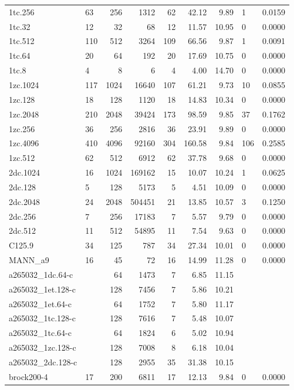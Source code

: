 \begin{longtable}{llrrrrrll}
1tc.256 & 63 & 256 & 1312 & 62 & 42.12 & 9.89 & 1 & 0.0159 \\
1tc.32 & 12 & 32 & 68 & 12 & 11.57 & 10.95 & 0 & 0.0000 \\
1tc.512 & 110 & 512 & 3264 & 109 & 66.56 & 9.87 & 1 & 0.0091 \\
1tc.64 & 20 & 64 & 192 & 20 & 17.69 & 10.75 & 0 & 0.0000 \\
1tc.8 & 4 & 8 & 6 & 4 & 4.00 & 14.70 & 0 & 0.0000 \\
1zc.1024 & 117 & 1024 & 16640 & 107 & 61.21 & 9.73 & 10 & 0.0855 \\
1zc.128 & 18 & 128 & 1120 & 18 & 14.83 & 10.34 & 0 & 0.0000 \\
1zc.2048 & 210 & 2048 & 39424 & 173 & 98.59 & 9.85 & 37 & 0.1762 \\
1zc.256 & 36 & 256 & 2816 & 36 & 23.91 & 9.89 & 0 & 0.0000 \\
1zc.4096 & 410 & 4096 & 92160 & 304 & 160.58 & 9.84 & 106 & 0.2585 \\
1zc.512 & 62 & 512 & 6912 & 62 & 37.78 & 9.68 & 0 & 0.0000 \\
2dc.1024 & 16 & 1024 & 169162 & 15 & 10.07 & 10.24 & 1 & 0.0625 \\
2dc.128 & 5 & 128 & 5173 & 5 & 4.51 & 10.09 & 0 & 0.0000 \\
2dc.2048 & 24 & 2048 & 504451 & 21 & 13.85 & 10.57 & 3 & 0.1250 \\
2dc.256 & 7 & 256 & 17183 & 7 & 5.57 & 9.79 & 0 & 0.0000 \\
2dc.512 & 11 & 512 & 54895 & 11 & 7.54 & 9.63 & 0 & 0.0000 \\
C125.9 & 34 & 125 & 787 & 34 & 27.34 & 10.01 & 0 & 0.0000 \\
MANN\_a9 & 16 & 45 & 72 & 16 & 14.99 & 11.28 & 0 & 0.0000 \\
a265032\_1dc.64-c &  & 64 & 1473 & 7 & 6.85 & 11.15 &  &  \\
a265032\_1et.128-c &  & 128 & 7456 & 7 & 5.86 & 10.21 &  &  \\
a265032\_1et.64-c &  & 64 & 1752 & 7 & 5.80 & 11.17 &  &  \\
a265032\_1tc.128-c &  & 128 & 7616 & 7 & 5.48 & 10.07 &  &  \\
a265032\_1tc.64-c &  & 64 & 1824 & 6 & 5.02 & 10.94 &  &  \\
a265032\_1zc.128-c &  & 128 & 7008 & 8 & 6.18 & 10.04 &  &  \\
a265032\_2dc.128-c &  & 128 & 2955 & 35 & 31.38 & 10.15 &  &  \\
brock200-4 & 17 & 200 & 6811 & 17 & 12.13 & 9.84 & 0 & 0.0000 \\

\end{longtable}

